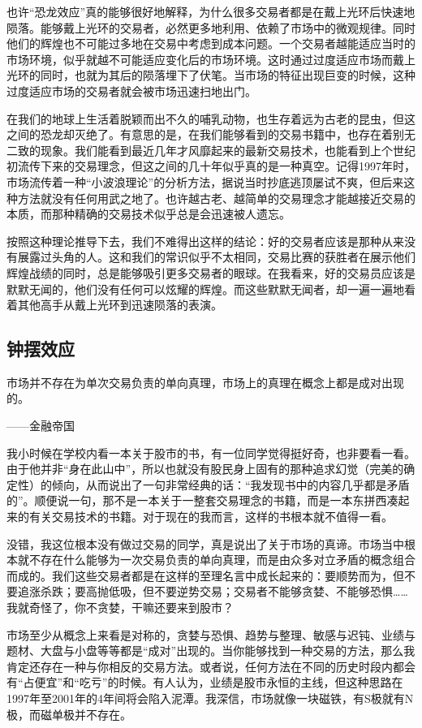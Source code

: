 也许“恐龙效应”真的能够很好地解释，为什么很多交易者都是在戴上光环后快速地陨落。能够戴上光环的交易者，必然更多地利用、依赖了市场中的微观规律。同时他们的辉煌也不可能过多地在交易中考虑到成本问题。一个交易者越能适应当时的市场环境，似乎就越不可能适应变化后的市场环境。这时通过过度适应市场而戴上光环的同时，也就为其后的陨落埋下了伏笔。当市场的特征出现巨变的时候，这种过度适应市场的交易者就会被市场迅速扫地出门。

在我们的地球上生活着脱颖而出不久的哺乳动物，也生存着远为古老的昆虫，但这之间的恐龙却灭绝了。有意思的是，在我们能够看到的交易书籍中，也存在着别无二致的现象。我们能看到最近几年才风靡起来的最新交易技术，也能看到上个世纪初流传下来的交易理念，但这之间的几十年似乎真的是一种真空。记得1997年时，市场流传着一种“小波浪理论”的分析方法，据说当时抄底逃顶屡试不爽，但后来这种方法就没有任何用武之地了。也许越古老、越简单的交易理念才能越接近交易的本质，而那种精确的交易技术似乎总是会迅速被人遗忘。

按照这种理论推导下去，我们不难得出这样的结论：好的交易者应该是那种从来没有展露过头角的人。这和我们的常识似乎不太相同，交易比赛的获胜者在展示他们辉煌战绩的同时，总是能够吸引更多交易者的眼球。在我看来，好的交易员应该是默默无闻的，他们没有任何可以炫耀的辉煌。而这些默默无闻者，却一遍一遍地看着其他高手从戴上光环到迅速陨落的表演。

\subsection{钟摆效应}

{\kaishu
市场并不存在为单次交易负责的单向真理，市场上的真理在概念上都是成对出现的。

\hfill ——金融帝国
}

我小时候在学校内看一本关于股市的书，有一位同学觉得挺好奇，也非要看一看。由于他并非“身在此山中”，所以也就没有股民身上固有的那种追求幻觉（完美的确定性）的倾向，从而说出了一句非常经典的话：“我发现书中的内容几乎都是矛盾的”。顺便说一句，那不是一本关于一整套交易理念的书籍，而是一本东拼西凑起来的有关交易技术的书籍。对于现在的我而言，这样的书根本就不值得一看。

没错，我这位根本没有做过交易的同学，真是说出了关于市场的真谛。市场当中根本就不存在什么能够为一次交易负责的单向真理，而是由众多对立矛盾的概念组合而成的。我们这些交易者都是在这样的至理名言中成长起来的：要顺势而为，但不要追涨杀跌；要高抛低吸，但不要逆势交易；交易者不能够贪婪、不能够恐惧……我就奇怪了，你不贪婪，干嘛还要来到股市？

市场至少从概念上来看是对称的，贪婪与恐惧、趋势与整理、敏感与迟钝、业绩与题材、大盘与小盘等等都是“成对”出现的。当你能够找到一种交易的方法，那么我肯定还存在一种与你相反的交易方法。或者说，任何方法在不同的历史时段内都会有“占便宜”和“吃亏”的时候。有人认为，业绩是股市永恒的主线，但这种思路在1997年至2001年的4年间将会陷入泥潭。我深信，市场就像一块磁铁，有S极就有N极，而磁单极并不存在。

